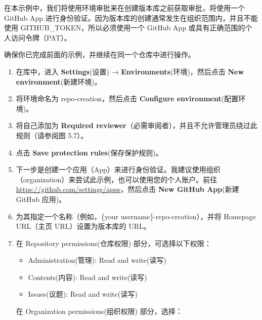 在本示例中，我们将使用环境审批来在创建版本库之前获取审批，将使用一个 GitHub App 进行身份验证。因为版本库的创建通常发生在组织范围内，并且不能使用 GITHUB\_TOKEN，所以必须使用一个 GitHub App 或具有正确范围的个人访问令牌（PAT）。


确保你已完成前面的示例，并继续在同一个仓库中进行操作。


\begin{enumerate}
\item 
在库中，进入 \textbf{Settings}(设置) → \textbf{Environments}(环境)，然后点击 \textbf{New environment}(新建环境)。

\item 
将环境命名为 repo-creation，然后点击 \textbf{Configure environment}(配置环境)。

\item 
将自己添加为 \textbf{Required reviewer}（必需审阅者），并且不允许管理员绕过此规则（请参阅图 5.7）。


\item 
点击 \textbf{Save protection rules}(保存保护规则)。

\item 
下一步是创建一个应用（App）来进行身份验证。我建议使用组织（organization）来尝试此示例，也可以使用您的个人账户。前往 \url{https://github.com/settings/apps}，然后点击 \textbf{New GitHub App}(新建 GitHub 应用)。

\item 
为其指定一个名称（例如，\{your username\}-repo-creation），并将 Homepage URL（主页 URL）设置为版本库的 URL。

\item 
在 Repository permissions(仓库权限) 部分，可选择以下权限：

\begin{itemize}
\item 
Administration(管理): Read and write(读写)

\item 
Contents(内容): Read and write(读写)

\item 
Issues(议题): Read and write(读写)
\end{itemize}

在 Organization permissions(组织权限) 部分，选择：


\end{enumerate}

